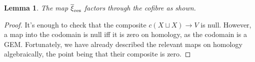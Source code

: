 \documentclass[11pt]{amsart}
\theoremstyle{plain}
\newtheorem{lem}[thm]{Lemma}
\theoremstyle{definition}
\renewcommand{\to}{\longrightarrow}
\newcommand{\fraks}{\mathfrak{s}}
\theoremstyle{plain}
\begin{document}
\begin{Operations on the Bousfield-Kan spectral sequence}
\begin{lem}
The map $\overline{\xi}_\textup{res}$ factors through the cofibre as shown.
\end{lem}
\begin{proof}
It's enough to check that the composite $c(X\sqcup X)\to  V$ is null. However, a map into the codomain is null iff it is zero on homology, as the codomain is a GEM. Fortunately, we have already described the relevant maps on homology algebraically, the point being that their composite is zero.
\end{proof}



\end{Operations on the Bousfield-Kan spectral sequence}
\end{document}

